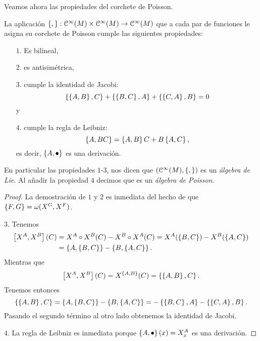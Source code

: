   Veamos ahora las propiedades del corchete de Poisson.
  \begin{prop}
    La aplicación $\left\lbrace , \right\rbrace:\mathcal{C}^{\infty}(M)\times\mathcal{C}^{\infty}(M) \rightarrow \mathcal{C}^{\infty}(M)$ que a cada par de funciones le asigna su corchete de Poisson cumple las siguientes propiedades:
\begin{enumerate}
  \item[$1.$] Es bilineal,
  \item[$2.$] es antisimétrica,
  \item[$3.$]  cumple la identidad de Jacobi:
 \begin{equation*}
   \left\lbrace\left\lbrace A,B\right\rbrace,C\right\rbrace+ \left\lbrace\left\lbrace B,C\right\rbrace,A\right\rbrace + \left\lbrace\left\lbrace C,A\right\rbrace,B\right\rbrace=0
 \end{equation*}
 y
 \item[$4.$] cumple la regla de Leibniz:
   \begin{equation*}
     \left\lbrace A,BC\right\rbrace=\left\lbrace A,B\right\rbrace C+B\left\lbrace A,C\right\rbrace,
   \end{equation*}
   es decir, $\left\lbrace A,\bullet\right\rbrace$ es una derivación.
\end{enumerate}
En particular las propiedades $1$-$3$, nos dicen que $(\mathcal{C}^{\infty}(M),\left\lbrace , \right\rbrace)$ es un \emph{álgebra de Lie}. Al añadir la propiedad $4$ decimos que es un \emph{álgebra de Poisson}. 
  \end{prop}
  \begin{proof}
    La demostración de $1$ y $2$ es inmediata del hecho de que $\left\lbrace F,G\right\rbrace=\omega(X^G,X^F)$.

    $3$. Tenemos 
   \begin{align*}
     \left[X^A,X^B\right] (C) & = X^A\circ X^B (C) - X^B\circ X^A (C)  = X^A(\left\lbrace B,C\right\rbrace)-X^B(\left\lbrace A,C\right\rbrace) \\
     &= \left\lbrace A,\left\lbrace B,C\right\rbrace\right\rbrace-\left\lbrace B,\left\lbrace A,C\right\rbrace\right\rbrace.
   \end{align*}
   Mientras que
   \begin{equation*}
     \left[X^A,X^B\right](C)=X^{\left\lbrace A,B\right\rbrace}(C)=\left\lbrace\left\lbrace A,B\right\rbrace,C\right\rbrace.
   \end{equation*}
   Tenemos entonces
   \begin{equation*}
     \left\lbrace\left\lbrace A,B\right\rbrace,C\right\rbrace=\left\lbrace A,\left\lbrace B,C\right\rbrace\right\rbrace-\left\lbrace B,\left\lbrace A,C\right\rbrace\right\rbrace=-\left\lbrace\left\lbrace B,C\right\rbrace,A\right\rbrace-\left\lbrace\left\lbrace C,A\right\rbrace,B\right\rbrace.
   \end{equation*}
   Pasando el segundo término al otro lado obtenemos la identidad de Jacobi.
    
   $4$. La regla de Leibniz es inmediata porque $\left\lbrace A,\bullet\right\rbrace(x)=X^A_x$ es una derivación.
  \end{proof}

